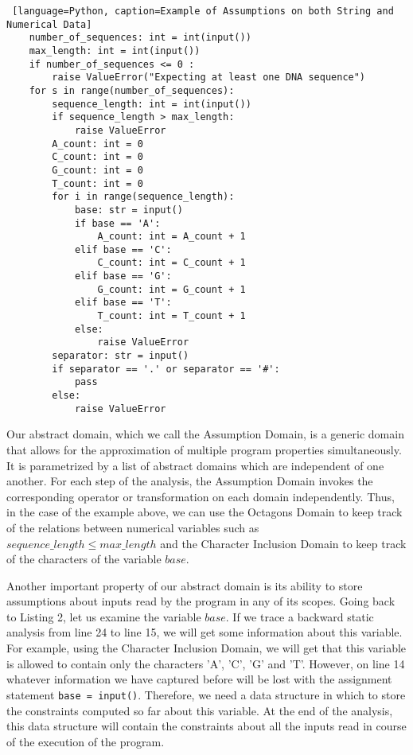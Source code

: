 \documentclass[10pt]{report}
\begin{document}
\begin{lstlisting} [language=Python, caption=Example of Assumptions on both String and Numerical Data]
	number_of_sequences: int = int(input())
	max_length: int = int(input())
	if number_of_sequences <= 0 :
		raise ValueError("Expecting at least one DNA sequence")
	for s in range(number_of_sequences):
		sequence_length: int = int(input())
		if sequence_length > max_length:
			raise ValueError
		A_count: int = 0
		C_count: int = 0
		G_count: int = 0
		T_count: int = 0
		for i in range(sequence_length):
			base: str = input()
			if base == 'A':
				A_count: int = A_count + 1
			elif base == 'C':
				C_count: int = C_count + 1
			elif base == 'G':
				G_count: int = G_count + 1
			elif base == 'T':
				T_count: int = T_count + 1
			else:
				raise ValueError
		separator: str = input()
		if separator == '.' or separator == '#':
			pass
		else:
			raise ValueError
\end{lstlisting}



Our abstract domain, which we call the Assumption Domain, is a generic domain that allows for the approximation of multiple program properties simultaneously. It is parametrized by a list of abstract domains which are independent of one another. For each step of the analysis, the Assumption Domain invokes the corresponding operator or transformation on each domain independently. Thus, in the case of the example above, we can use the Octagons Domain \cite{octagon} to keep track of the relations between numerical variables such as $sequence\_length \leq max\_length$ and the Character Inclusion Domain \cite{character} to keep track of the characters of the variable $base$.


Another important property of our abstract domain is its ability to store assumptions about inputs read by the program in any of its scopes. Going back to Listing 2, let us examine the variable $base$. If we trace a backward static analysis from line 24 to line 15, we will get some information about this variable. For example, using the Character Inclusion Domain, we will get that this variable is allowed to contain only the characters 'A', 'C', 'G' and 'T'. However, on line 14 whatever information we have captured before will be lost with the assignment statement \verb|base = input()|. Therefore, we need a data structure in which to store the constraints computed so far about this variable. At the end of the analysis, this data structure will contain the constraints about all the inputs read in course of the execution of the program. 
\end{document}
